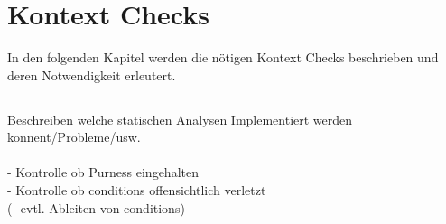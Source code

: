 \section{Kontext Checks}

In den folgenden Kapitel werden die nötigen Kontext Checks beschrieben und 
deren Notwendigkeit erleutert.

\subsection{}

Beschreiben welche statischen Analysen Implementiert werden konnent/Probleme/usw.\\
\\
- Kontrolle ob Purness eingehalten\\
- Kontrolle ob conditions offensichtlich verletzt\\
(- evtl. Ableiten von conditions)




